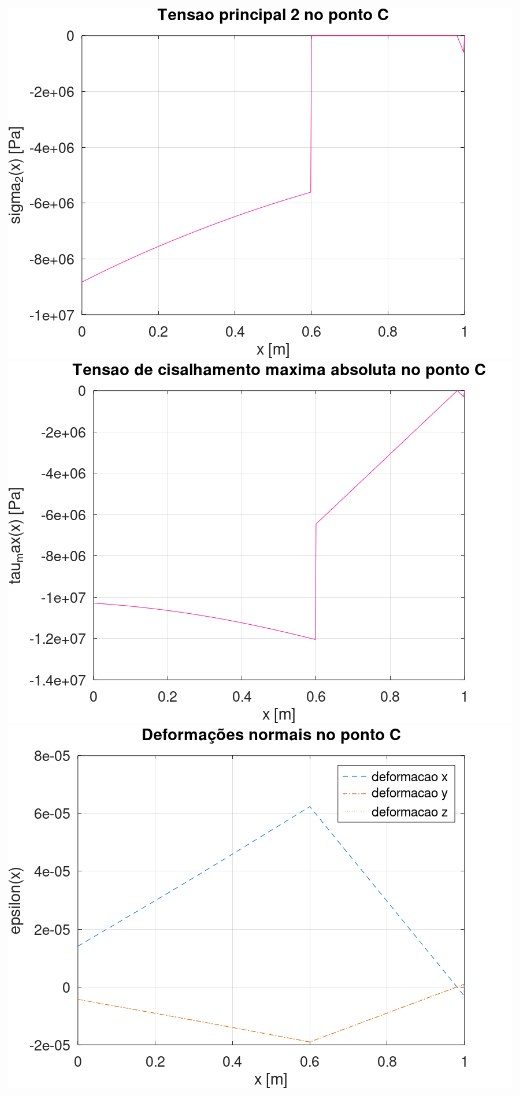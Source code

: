 \documentclass[10pt]{article}
\begin{document}
\begin{center}
    \includegraphics[scale=0.25]{figure31.png}
    \includegraphics[scale=0.25]{figure32.png}
    \includegraphics[scale=0.25]{figure33.png}

\end{center}
\end{document}
